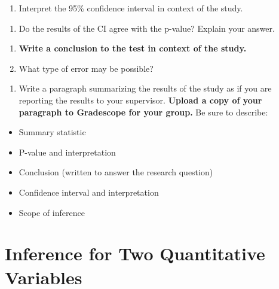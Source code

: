 \documentclass[
]{report}
\providecommand{\tightlist}{%
  \setlength{\itemsep}{0pt}\setlength{\parskip}{0pt}}
\begin{document}
\begin{enumerate}
\def\labelenumi{\arabic{enumi}.}
\setcounter{enumi}{15}
\tightlist
\item
  Interpret the 95\% confidence interval in context of the study.
\end{enumerate}

\vspace{1in}

\begin{enumerate}
\def\labelenumi{\arabic{enumi}.}
\setcounter{enumi}{16}
\tightlist
\item
  Do the results of the CI agree with the p-value? Explain your answer.
\end{enumerate}

\vspace{0.5in}

\begin{enumerate}
\def\labelenumi{\arabic{enumi}.}
\setcounter{enumi}{17}
\item
  \textbf{Write a conclusion to the test in context of the study.}
  \vspace{0.8in}
\item
  What type of error may be possible?
  \vspace{0.2in}
\end{enumerate}

\newpage

\begin{enumerate}
\def\labelenumi{\arabic{enumi}.}
\setcounter{enumi}{19}
\tightlist
\item
  Write a paragraph summarizing the results of the study as if you are reporting the results to your supervisor. \textbf{Upload a copy of your paragraph to Gradescope for your group.} Be sure to describe:
\end{enumerate}

\begin{itemize}
\item
  Summary statistic
\item
  P-value and interpretation
\item
  Conclusion (written to answer the research question)
\item
  Confidence interval and interpretation
\item
  Scope of inference
\end{itemize}

\vspace{3in}

\hypertarget{inference-for-two-quantitative-variables}{%
\chapter{Inference for Two Quantitative Variables}\label{inference-for-two-quantitative-variables}}
\end{document}
